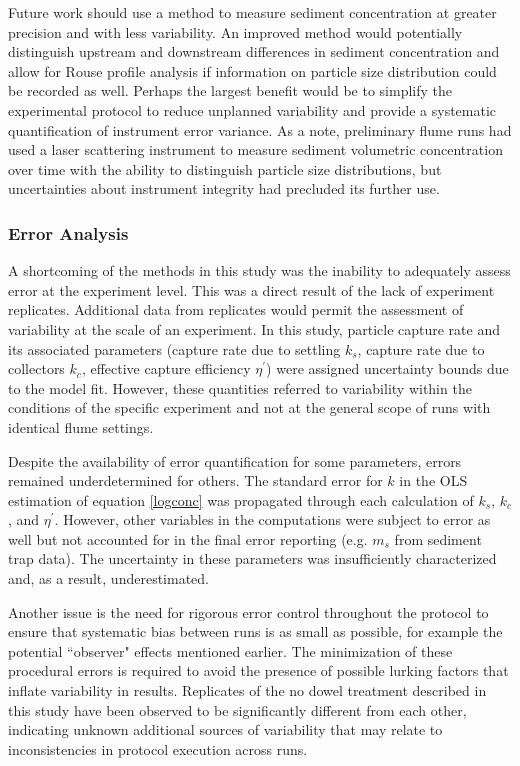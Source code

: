 \documentclass[12pt]{article}
\begin{document}
Future work should use a method to measure sediment concentration at greater precision and with less variability. An improved method would potentially distinguish upstream and downstream differences in sediment concentration and allow for Rouse profile analysis if information on particle size distribution could be recorded as well. Perhaps the largest benefit would be to simplify the experimental protocol to reduce unplanned variability and provide a systematic quantification of instrument error variance. As a note, preliminary flume runs had used a laser scattering instrument to measure sediment volumetric concentration over time with the ability to distinguish particle size distributions, but uncertainties about instrument integrity had precluded its further use.

\subsubsection{Error Analysis}

A shortcoming of the methods in this study was the inability to adequately assess error at the experiment level. This was a direct result of the lack of experiment replicates. Additional data from replicates would permit the assessment of variability at the scale of an experiment. In this study, particle capture rate and its associated parameters (capture rate due to settling $k_s$, capture rate due to collectors $k_c$, effective capture efficiency $\eta^\prime$) were assigned uncertainty bounds due to the model fit. However, these quantities referred to variability within the conditions of the specific experiment and not at the general scope of runs with identical flume settings.

Despite the availability of error quantification for some parameters, errors remained underdetermined for others. The standard error for $k$ in the OLS estimation of equation \ref{logconc} was propagated through each calculation of $k_s$, $k_c$, and $\eta^\prime$. However, other variables in the computations were subject to error as well but not accounted for in the final error reporting (e.g. $m_s$ from sediment trap data). The uncertainty in these parameters was insufficiently characterized and, as a result, underestimated.

Another issue is the need for rigorous error control throughout the protocol to ensure that systematic bias between runs is as small as possible, for example the potential ``observer" effects mentioned earlier. The minimization of these procedural errors is required to avoid the presence of possible lurking factors that inflate variability in results. Replicates of the no dowel treatment described in this study have been observed to be significantly different from each other, indicating unknown additional sources of variability that may relate to inconsistencies in protocol execution across runs.
\end{document}
